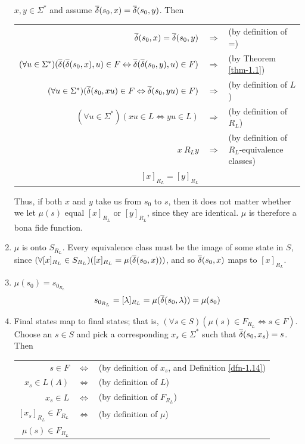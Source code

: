 \begin{thm}
\begin{enumerate}
$x,y \in \Sigma^*$ and assume $\DBAR(s_0,x)=\DBAR(s_0,y)$. Then
\begin{center}
\begin{tabular}{rcl}
$\DBAR(s_0,x)=\DBAR(s_0,y)$ & $\Rightarrow$ & (by definition of =) \\
$(\forall u \in \Sigma^*)(\DBAR(\DBAR(s_0,x),u) \in F \Leftrightarrow 
\DBAR(\DBAR(s_0,y),u) \in F)$ & $\Rightarrow$ & (by Theorem \ref{thm-1.1}) \\
$(\forall u \in \Sigma^*)(\DBAR(s_0,xu) \in F \Leftrightarrow
\DBAR(s_0,yu) \in F)$ & $\Rightarrow$ & (by definition of $L$) \\
$(\forall u \in \Sigma^*)(xu \in L \Leftrightarrow yu \in L)$ & $\Rightarrow$ &
(by definition of $R_L$) \\
$x\ R_L y$ & $\Rightarrow$ & (by definition of $R_L$-equivalence classes) \\
$[x]_{R_L} = [y]_{R_L}$ &&
\end{tabular}
\end{center}

Thus, if both $x$ and $y$ take us from $s_0$ to $s$, then it does not matter
whether we let $\mu(s)$ equal $[x]_{R_L}$ or $[y]_{R_L}$, since they are
identical. $\mu$ is therefore a bona fide function.

\item $\mu$ is onto $S_{R_L}$. Every equivalence class must be the image of some
state in $S$, since $(\forall [x]_{R_L}\in S_{R_L})([x]_{R_L}=\mu(\overline{\delta}(s_0,x)))$,
and so $\overline{\delta}(s_0,x)$ maps to $[x]_{R_L}$.

\item $\mu(s_0) = s_{0_{R_L}}$
\[ s_{0_{R_L}} = [\lambda]_{R_L} = \mu(\overline{\delta}(s_0,\lambda)) = \mu(s_0) \]

\item Final states map to final states; that is,
$(\forall s \in S)(\mu(s) \in F_{R_L} \Leftrightarrow s \in F)$. Choose an
$s \in S$ and pick a corresponding $x_s \in \Sigma^*$ such that
$\overline{\delta}(s_0,x_s) = s$. Then
\begin{center}
\begin{tabular}{rcl}
$s \in F$ & $\Leftrightarrow$ & (by definition of $x_s$, and Definition \ref{dfn-1.14}) \\
$x_s \in L(A)$ & $\Leftrightarrow$ & (by definition of $L$) \\
$x_s \in L$ & $\Leftrightarrow$ & (by definition of $F_{R_L}$) \\
$[x_s]_{R_L} \in F_{R_L}$ & $\Leftrightarrow$ & (by definition of $\mu$) \\
$\mu(s) \in F_{R_L}$ &&
\end{tabular}
\end{center}


\end{enumerate}
\end{thm}
